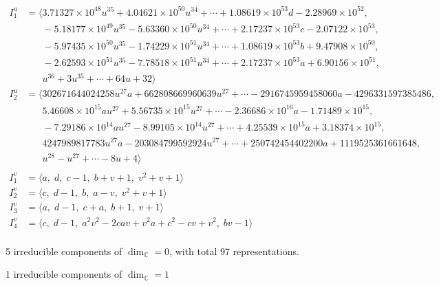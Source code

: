 \documentclass[1p]{elsarticle_modified}
\theoremstyle{definition}
\begin{document}
\begin{align*}
I^u_{1}&=\langle 
3.71327\times10^{48} u^{35}+4.04621\times10^{50} u^{34}+\cdots+1.08619\times10^{53} d-2.28969\times10^{52},\\
\phantom{I^u_{1}}&\phantom{= \langle  }-5.18177\times10^{49} u^{35}-5.63360\times10^{50} u^{34}+\cdots+2.17237\times10^{53} c-2.07122\times10^{53},\\
\phantom{I^u_{1}}&\phantom{= \langle  }-5.97435\times10^{50} u^{35}-1.74229\times10^{51} u^{34}+\cdots+1.08619\times10^{53} b+9.47908\times10^{50},\\
\phantom{I^u_{1}}&\phantom{= \langle  }-2.62593\times10^{51} u^{35}-7.78518\times10^{51} u^{34}+\cdots+2.17237\times10^{53} a+6.90156\times10^{51},\\
\phantom{I^u_{1}}&\phantom{= \langle  }u^{36}+3 u^{35}+\cdots+64 u+32\rangle \\
I^u_{2}&=\langle 
302671644024258 u^{27} a+662808669960639 u^{27}+\cdots-2916745959458060 a-4296331597385486,\\
\phantom{I^u_{2}}&\phantom{= \langle  }5.46608\times10^{15} a u^{27}+5.56735\times10^{15} u^{27}+\cdots-2.36686\times10^{16} a-1.71489\times10^{15},\\
\phantom{I^u_{2}}&\phantom{= \langle  }-7.29186\times10^{14} a u^{27}-8.99105\times10^{14} u^{27}+\cdots+4.25539\times10^{15} a+3.18374\times10^{15},\\
\phantom{I^u_{2}}&\phantom{= \langle  }4247989817783 u^{27} a-203084799592924 u^{27}+\cdots+250742454402200 a+1119525361661648,\\
\phantom{I^u_{2}}&\phantom{= \langle  }u^{28}- u^{27}+\cdots-8 u+4\rangle \\
\\
I^v_{1}&=\langle 
a,\;d,\;c-1,\;b+v+1,\;v^2+v+1\rangle \\
I^v_{2}&=\langle 
c,\;d-1,\;b,\;a- v,\;v^2+v+1\rangle \\
I^v_{3}&=\langle 
a,\;d-1,\;c+a,\;b+1,\;v+1\rangle \\
I^v_{4}&=\langle 
c,\;d-1,\;a^2 v^2-2 c a v+v^2 a+c^2- c v+v^2,\;b v-1\rangle \\
\end{align*}
\raggedright * 5 irreducible components of $\dim_{\mathbb{C}}=0$, with total 97 representations.\\
\raggedright * 1 irreducible components of $\dim_{\mathbb{C}}=1$ \\
\end{document}
